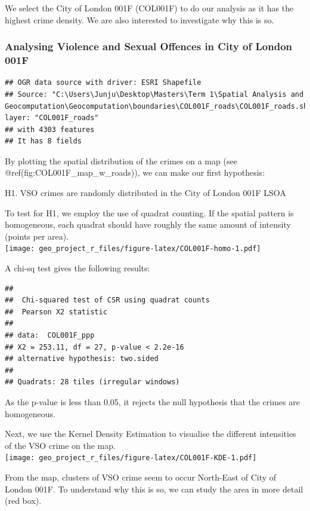 \documentclass[]{article}
\theoremstyle{definition}
\theoremstyle{definition}
\theoremstyle{definition}
\theoremstyle{remark}
\begin{document}
We select the City of London 001F (COL001F) to do our analysis as it has
the highest crime density. We are also interested to investigate why
this is so.

\subsubsection{Analysing Violence and Sexual Offences in City of London
001F}\label{analysing-violence-and-sexual-offences-in-city-of-london-001f}

\begin{verbatim}
## OGR data source with driver: ESRI Shapefile 
## Source: "C:\Users\Junju\Desktop\Masters\Term 1\Spatial Analysis and Geocomputation\Geocomputation\boundaries\COL001F_roads\COL001F_roads.shp", layer: "COL001F_roads"
## with 4303 features
## It has 8 fields
\end{verbatim}

By plotting the spatial distribution of the crimes on a map (see
@ref(fig:COL001F\_map\_w\_roads)), we can make our first hypothesis:

H1. VSO crimes are randomly distributed in the City of London 001F LSOA

To test for H1, we employ the use of quadrat counting. If the spatial
pattern is homogeneous, each quadrat should have roughly the same amount
of intensity (points per area).\\
\texttt{[image: geo\_project\_r\_files/figure-latex/COL001F-homo-1.pdf]}

A chi-sq test gives the following results:

\begin{verbatim}
## 
##  Chi-squared test of CSR using quadrat counts
##  Pearson X2 statistic
## 
## data:  COL001F_ppp
## X2 = 253.11, df = 27, p-value < 2.2e-16
## alternative hypothesis: two.sided
## 
## Quadrats: 28 tiles (irregular windows)
\end{verbatim}

As the p-value is less than 0.05, it rejects the null hypothesis that
the crimes are homogeneous.

Next, we use the Kernel Density Estimation to visualise the different
intensities of the VSO crime on the map.\\
\texttt{[image: geo\_project\_r\_files/figure-latex/COL001F-KDE-1.pdf]}

From the map, clusters of VSO crime seem to occur North-East of City of
London 001F. To understand why this is so, we can study the area in more
detail (red box).
\end{document}
